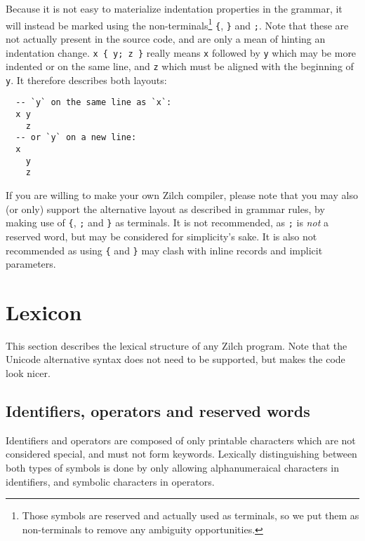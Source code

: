 \noindent Because it is not easy to materialize indentation properties in the grammar, it will instead be marked using the non-terminals\footnote{Those symbols are reserved and actually used as terminals, so we put them as non-terminals to remove any ambiguity opportunities.} \texttt{\{}, \texttt{\}} and \texttt{;}.
Note that these are not actually present in the source code, and are only a mean of hinting an indentation change.
\texttt{x \{ y; z \}} really means \texttt{x} followed by \texttt{y} which may be more indented or on the same line, and \texttt{z} which must be aligned with the beginning of \texttt{y}.
It therefore describes both layouts:

\noindent\begin{verbatim}
  -- `y` on the same line as `x`:
  x y
    z
  -- or `y` on a new line:
  x
    y
    z
\end{verbatim}
\vspace*{\baselineskip}

\begin{warningbox}
	If you are willing to make your own Zilch compiler, please note that you may also (or only) support the alternative layout as described in grammar rules, by making use of \verb|{|, \verb|;| and \verb|}| as terminals.
	It is not recommended, as \verb|;| is \textit{not} a reserved word, but may be considered for simplicity's sake.
	It is also not recommended as using \verb|{| and \verb|}| may clash with inline records and implicit parameters.
\end{warningbox}

\section{Lexicon}\label{sec:zilch-grammar-lexical}

This section describes the lexical structure of any Zilch program.
Note that the Unicode alternative syntax does not need to be supported, but makes the code look nicer.

\subsection{Identifiers, operators and reserved words}\label{subsec:zilch-grammar-lexical-identifiers}

Identifiers and operators are composed of only printable characters which are not considered special, and must not form keywords.
Lexically distinguishing between both types of symbols is done by only allowing alphanumeraical characters in identifiers, and symbolic characters in operators.

